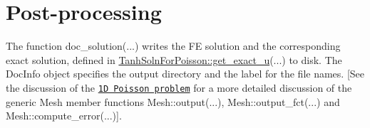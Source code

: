  

\hypertarget{index_doc}{}\section{Post-\/processing}\label{index_doc}
The function {\ttfamily doc\+\_\+solution}(...) writes the FE solution and the corresponding exact solution, defined in {\ttfamily \hyperlink{namespaceTanhSolnForPoisson_af7896e9c18ce6438c73ae2a875e8b7de}{Tanh\+Soln\+For\+Poisson\+::get\+\_\+exact\+\_\+u}}(...) to disk. The {\ttfamily Doc\+Info} object specifies the output directory and the label for the file names. \mbox{[}See the discussion of the \href{../../../poisson/one_d_poisson/html/index.html}{\tt 1D Poisson problem} for a more detailed discussion of the generic {\ttfamily Mesh} member functions {\ttfamily Mesh\+::output}(...), {\ttfamily Mesh\+::output\+\_\+fct}(...) and {\ttfamily Mesh\+::compute\+\_\+error}(...)\mbox{]}.


